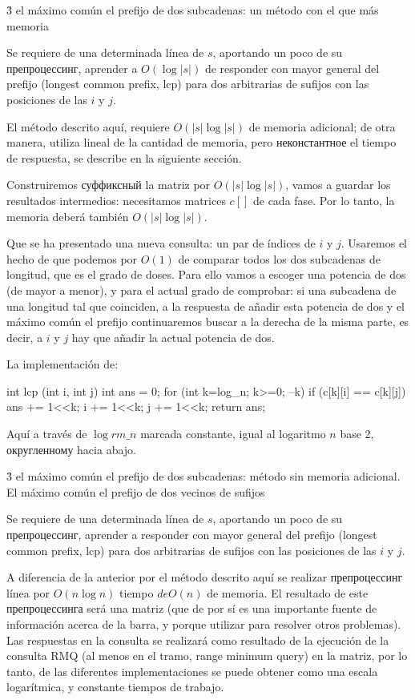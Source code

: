 \h3{ el máximo común el prefijo de dos subcadenas: un método con el que más memoria }

Se requiere de una determinada línea de $s$, aportando un poco de su препроцессинг, aprender a $O(\log |s|)$ de responder con mayor general del prefijo (longest common prefix, lcp) para dos arbitrarias de sufijos con las posiciones de las $i$ y $j$.

El método descrito aquí, requiere $O (|s| \log |s|)$ de memoria adicional; de otra manera, utiliza lineal de la cantidad de memoria, pero неконстантное el tiempo de respuesta, se describe en la siguiente sección.

Construiremos суффиксный la matriz por $O (|s| \log |s|)$, vamos a guardar los resultados intermedios: necesitamos matrices $c[]$ de cada fase. Por lo tanto, la memoria deberá también $O (|s| \log |s|)$.

Que se ha presentado una nueva consulta: un par de índices de $i$ y $j$. Usaremos el hecho de que podemos por $O(1)$ de comparar todos los dos subcadenas de longitud, que es el grado de doses. Para ello vamos a escoger una potencia de dos (de mayor a menor), y para el actual grado de comprobar: si una subcadena de una longitud tal que coinciden, a la respuesta de añadir esta potencia de dos y el máximo común el prefijo continuaremos buscar a la derecha de la misma parte, es decir, a $i$ y $j$ hay que añadir la actual potencia de dos.

La implementación de:

\code
int lcp (int i, int j) {
int ans = 0;
for (int k=log_n; k>=0; --k)
if (c[k][i] == c[k][j]) {
ans += 1<<k;
i += 1<<k;
j += 1<<k;
}
return ans;
}
\endcode

Aquí a través de $\log rm\_n$ marcada constante, igual al logaritmo $n$ base 2, округленному hacia abajo.


\h3{ el máximo común el prefijo de dos subcadenas: método sin memoria adicional. El máximo común el prefijo de dos vecinos de sufijos }

Se requiere de una determinada línea de $s$, aportando un poco de su препроцессинг, aprender a responder con mayor general del prefijo (longest common prefix, lcp) para dos arbitrarias de sufijos con las posiciones de las $i$ y $j$.

A diferencia de la anterior por el método descrito aquí se realizar препроцессинг línea por $O(n \log n)$ tiempo $de O(n)$ de memoria. El resultado de este препроцессинга será una matriz (que de por sí es una importante fuente de información acerca de la barra, y porque utilizar para resolver otros problemas). Las respuestas en la consulta se realizará como resultado de la ejecución de la consulta RMQ (al menos en el tramo, range minimum query) en la matriz, por lo tanto, de las diferentes implementaciones se puede obtener como una escala logarítmica, y constante tiempos de trabajo.

